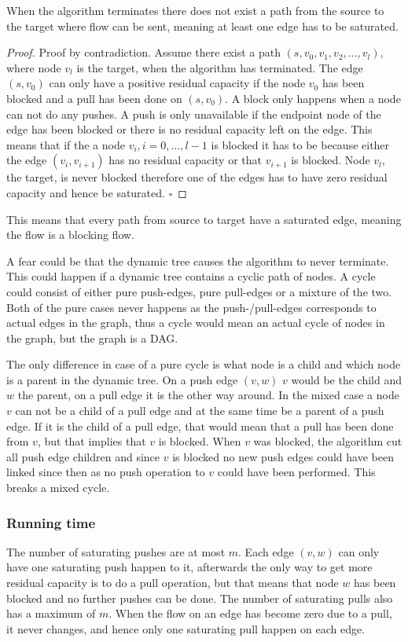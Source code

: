 \begin{lemma}
	When the algorithm terminates there does not exist a path from the source to the target where flow can be sent, meaning at least one edge has to be saturated.
\end{lemma}
\begin{proof}
	Proof by contradiction. Assume there exist a path $(s,v_0, v_1, v_2,\dots, v_l)$, where node $v_l$ is the target, when the algorithm has terminated. The edge $(s,v_0)$ can only have 
	a positive residual capacity if the node $v_0$ has been blocked and a pull has been done on $(s,v_0)$. A block only happens when a node can not do any pushes. 
	A push is only unavailable if the endpoint node of the edge has been blocked or there is no residual capacity left on the edge. 
	This means that if the a node $v_i, i = 0,\dots,l-1$ is blocked it has to be because either the edge $(v_i, v_{i+1})$ has no residual capacity or that 
	$v_{i+1}$ is blocked. Node $v_l$, the target, is never blocked therefore one of the edges has to have zero residual capacity and hence be saturated. $\square$
\end{proof}
This means that every path from source to target have a saturated edge, meaning the flow is a blocking flow.

A fear could be that the dynamic tree causes the algorithm to never terminate. This could happen if a dynamic tree contains a cyclic path of nodes.
A cycle could consist of either pure push-edges, pure pull-edges or a mixture of the two. Both of the pure cases never happens as the push-/pull-edges corresponds
to actual edges in the graph, thus a cycle would mean an actual cycle of nodes in the graph, but the graph is a DAG. 

The only difference in case of a pure cycle is what node is a child and which node is a parent in the dynamic tree. 
On a push edge $(v,w)$ $v$ would be the child and $w$ the parent, on a pull edge it is the other way around. 
In the mixed case a node $v$ can not be a child of a pull edge and at the same time be a parent of a push edge. 
If it is the child of a pull edge, that would mean that a pull has been done from $v$, but that implies that $v$ is blocked.
When $v$ was blocked, the algorithm cut all push edge children and since $v$ is blocked no new push edges could have been linked since then as no push operation to $v$ could
have been performed. This breaks a mixed cycle.

\subsubsection{Running time}\label{GR-BF-RT}
The number of saturating pushes are at most $m$. 
Each edge $(v,w)$ can only have one saturating push happen to it, afterwards the only way to get more residual capacity is to
do a pull operation, but that means that node $w$ has been blocked and no further pushes can be done. 
The number of saturating pulls also has a maximum of $m$. When the flow on an edge has become zero due to a pull, it never changes, and hence only one saturating pull happen on each edge.

